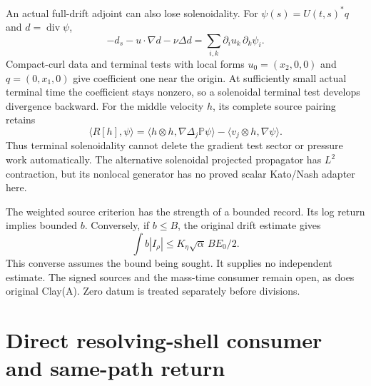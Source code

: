 \documentclass[11pt]{article}
\begin{document}
An actual full-drift adjoint can also lose solenoidality. For
$\psi(s)=U(t,s)^*q$ and $d=\operatorname{div}\psi$,
\[
 -d_s-u\cdot\nabla d-\nu\Delta d
 =\sum_{i,k}\partial_i u_k\,\partial_k\psi_i.
\]
Compact-curl data and terminal tests with local forms
$u_0=(x_2,0,0)$ and $q=(0,x_1,0)$ give coefficient one near the origin.
At sufficiently small actual terminal time the coefficient stays nonzero,
so a solenoidal terminal test develops divergence backward. For the middle
velocity $h$, its complete source pairing retains
\[
 \langle R[h],\psi\rangle
 =\langle h\otimes h,\nabla\Delta_j\mathbb P\psi\rangle
 -\langle v_j\otimes h,\nabla\psi\rangle.
\]
Thus terminal solenoidality cannot delete the gradient test sector or
pressure work automatically. The alternative solenoidal projected
propagator has $L^2$ contraction, but its nonlocal generator has no proved
scalar Kato/Nash adapter here.

The weighted source criterion has the strength of a bounded record.
Its log return implies bounded $b$. Conversely, if $b\le B$,
the original drift estimate gives
\[
 \int b|I_\rho|\le K_\eta\sqrt\alpha\,BE_0/2.
\]
This converse assumes the bound being sought. It supplies no independent
estimate. The signed sources and the mass-time consumer remain open,
as does original Clay(A). Zero datum is treated separately before divisions.


\section{Direct resolving-shell consumer and same-path return}
\end{document}
